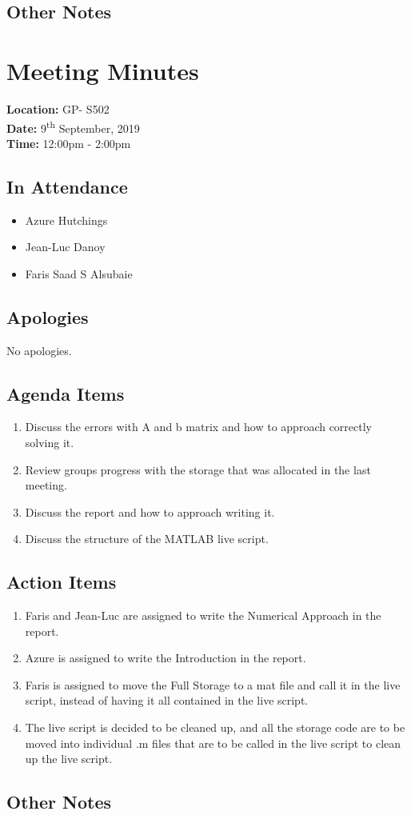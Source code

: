 \documentclass{article}
\begin{document}
\subsection*{Other Notes}

\pagebreak

\section{Meeting Minutes}
\textbf{Location:} GP- S502 \\
\textbf{Date:} 9\textsuperscript{th} September, 2019 \\
\textbf{Time:} 12:00pm - 2:00pm

\subsection*{In Attendance}
\begin{itemize}
\item Azure Hutchings
\item Jean-Luc Danoy
\item Faris Saad S Alsubaie
\end{itemize}

\subsection*{Apologies}
No apologies. 

\subsection*{Agenda Items}
\begin{enumerate}
\item Discuss the errors with A and b matrix and how to approach correctly solving it.
\item Review groups progress with the storage that was allocated in the last meeting.
\item Discuss the report and how to approach writing it. 
\item Discuss the structure of the MATLAB live script.
\end{enumerate}

\subsection*{Action Items}
\begin{enumerate}
\item Faris and Jean-Luc are assigned to write the Numerical Approach in the report.
\item Azure is assigned to write the Introduction in the report.
\item Faris is assigned to move the Full Storage to a mat file and call it in the live script, instead of having it all contained in the live script.
\item The live script is decided to be cleaned up, and all the storage code are to be moved into individual .m files that are to be called in the live script to clean up the live script.
\end{enumerate}

\subsection*{Other Notes}

\pagebreak
\end{document}
